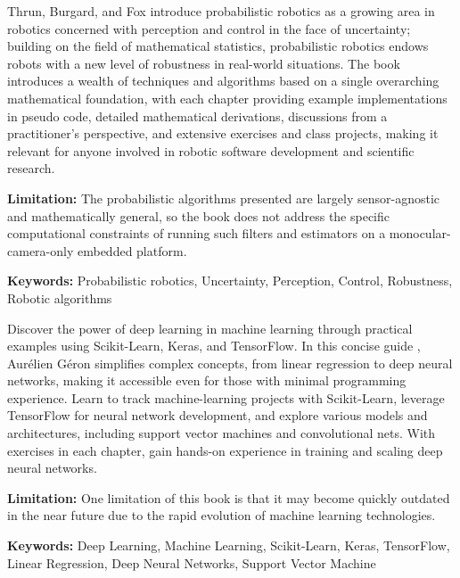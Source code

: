 {
	Thrun, Burgard, and Fox \cite{Thrun:2005} introduce probabilistic robotics as a growing area in robotics concerned with perception and control in the face of uncertainty; building on the field of mathematical statistics, probabilistic robotics endows robots with a new level of robustness in real-world situations. The book introduces a wealth of techniques and algorithms based on a single overarching mathematical foundation, with each chapter providing example implementations in pseudo code, detailed mathematical derivations, discussions from a practitioner's perspective, and extensive exercises and class projects, making it relevant for anyone involved in robotic software development and scientific research.
	
	\bigskip
	\textbf{Limitation:} The probabilistic algorithms presented are largely sensor-agnostic and mathematically general, so the book does not address the specific computational constraints of running such filters and estimators on a monocular-camera-only embedded platform.
	
	\scriptsize{\textbf{Keywords:} Probabilistic robotics, Uncertainty, Perception, Control, Robustness, Robotic algorithms}
}

{
	Discover the power of deep learning in machine learning through practical examples using Scikit-Learn, Keras, and TensorFlow. In this concise guide \cite{Geron:2022}, Aurélien Géron simplifies complex concepts, from linear regression to deep neural networks, making it accessible even for those with minimal programming experience. Learn to track machine-learning projects with Scikit-Learn, leverage TensorFlow for neural network development, and explore various models and architectures, including support vector machines and convolutional nets. With exercises in each chapter, gain hands-on experience in training and scaling deep neural networks.
	
	\bigskip
	\textbf{Limitation:} One limitation of this book is that it may become quickly outdated in the near future due to the rapid evolution of machine learning technologies.
	
	\scriptsize{\textbf{Keywords:} Deep Learning, Machine Learning, Scikit-Learn, Keras, TensorFlow, Linear Regression, Deep Neural Networks, Support Vector Machine}
}


